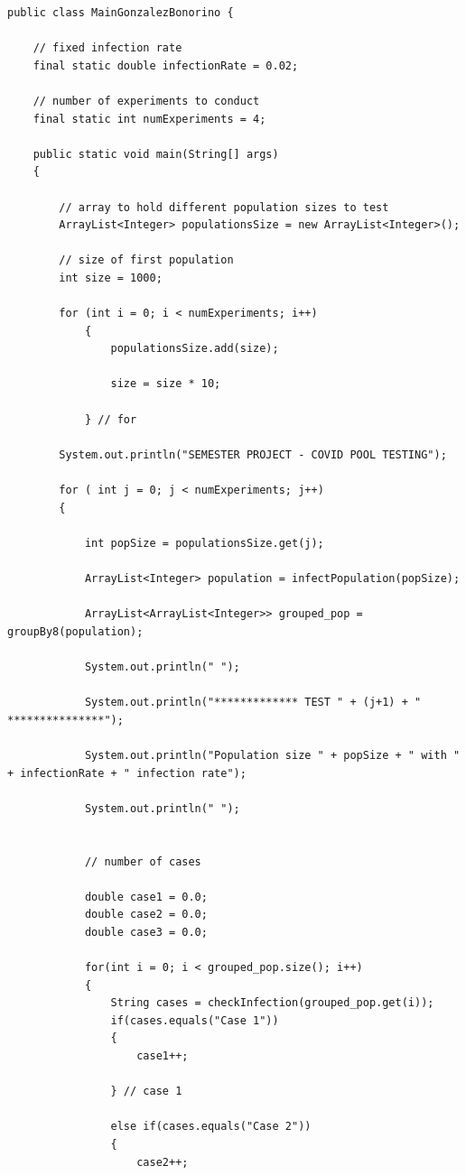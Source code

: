 \documentclass[letterpaper, 10pt]{article}
\begin{document}
\begin{lstlisting}
public class MainGonzalezBonorino {
	
	// fixed infection rate 
	final static double infectionRate = 0.02;
	
	// number of experiments to conduct
	final static int numExperiments = 4;

	public static void main(String[] args) 
	{
		
		// array to hold different population sizes to test
		ArrayList<Integer> populationsSize = new ArrayList<Integer>();
		
		// size of first population
		int size = 1000;
		
		for (int i = 0; i < numExperiments; i++)
			{
				populationsSize.add(size);
				
				size = size * 10;
				
			} // for

		System.out.println("SEMESTER PROJECT - COVID POOL TESTING");
        
	    for ( int j = 0; j < numExperiments; j++)
	    {

	    	int popSize = populationsSize.get(j);
	    	
	        ArrayList<Integer> population = infectPopulation(popSize);
	        
	        ArrayList<ArrayList<Integer>> grouped_pop = groupBy8(population);
	        
			System.out.println(" ");
			
			System.out.println("************* TEST " + (j+1) + " ***************");
			
	        System.out.println("Population size " + popSize + " with " + infectionRate + " infection rate");
	
			System.out.println(" ");

	        
	        // number of cases
	        
	        double case1 = 0.0;
	        double case2 = 0.0;
	        double case3 = 0.0;
	        
	        for(int i = 0; i < grouped_pop.size(); i++)
	        {
	            String cases = checkInfection(grouped_pop.get(i));
	            if(cases.equals("Case 1"))
	            {
	                case1++;
	                
	            } // case 1
	            
	            else if(cases.equals("Case 2"))
	            {
	                case2++;
	                

\end{lstlisting}
\end{document}
